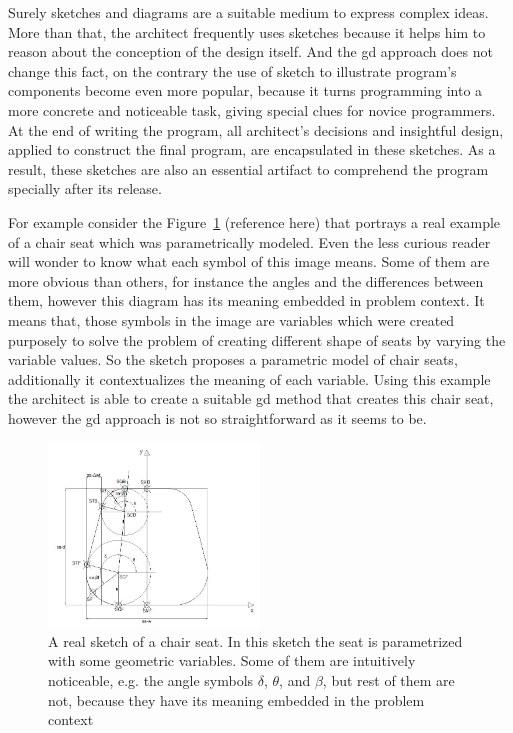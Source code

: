 Surely sketches and diagrams are a suitable medium to express complex ideas. More than that, the architect frequently uses sketches because it helps him to reason about the conception of the design itself. And the \gls{gd} approach does not change this fact, on the contrary the use of sketch to illustrate program's components become even more popular, because it turns programming into a more  concrete and noticeable task, giving special clues for novice programmers. At the end of writing the program, all architect's decisions and insightful design, applied to construct the final program, are encapsulated in these sketches. As a result, these
sketches are also an essential artifact to comprehend the program specially after its release. 

For example consider the Figure~\ref{fig:chairseat} (reference here) that portrays a real example of a chair seat which was parametrically modeled. Even the less curious reader will wonder to know what each symbol of this image means. Some of them are more obvious than others, for instance the angles and the differences between them, however this diagram has its meaning embedded in problem context. It means that, those symbols in the image are variables which were created purposely to solve the problem of creating different shape of seats by varying the variable values. So the sketch proposes a parametric model of chair seats, additionally it contextualizes the meaning of each variable. Using this example the architect is able to create a suitable \gls{gd} method that creates this chair seat, however the \gls{gd} approach is not so straightforward as it seems to be. 

\begin{figure}[!htbp]
  \centering
  \includegraphics[width=0.5\textwidth]{images/seat}
    \caption{A real sketch of a chair seat. In this sketch the seat is parametrized with some geometric variables. Some of them are intuitively noticeable, e.g. the angle symbols $\delta$, $\theta$, and $\beta$, but rest of them are not, because they have its meaning embedded in the problem context}
  \label{fig:chairseat}
\end{figure}

